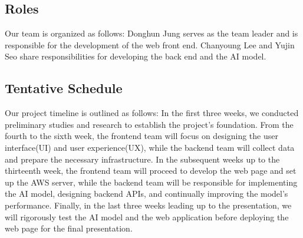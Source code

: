 \subsection{Roles}

Our team is organized as follows: 
Donghun Jung serves as the team leader and is responsible for the development of the web front end.
Chanyoung Lee and Yujin Seo share responsibilities for developing the back end and the AI model.

\subsection{Tentative Schedule}

Our project timeline is outlined as follows: 
In the first three weeks, we conducted preliminary studies and research to establish the project's foundation. 
From the fourth to the sixth week, the frontend team will focus on designing the user interface(UI) and user experience(UX), 
while the backend team will collect data and prepare the necessary infrastructure. 
In the subsequent weeks up to the thirteenth week, the frontend team will proceed to develop the web page and set up the AWS server, 
while the backend team will be responsible for implementing the AI model, designing backend APIs, and continually improving the model's performance. 
Finally, in the last three weeks leading up to the presentation, we will rigorously test the AI model and the web application before deploying the web page for the final presentation.